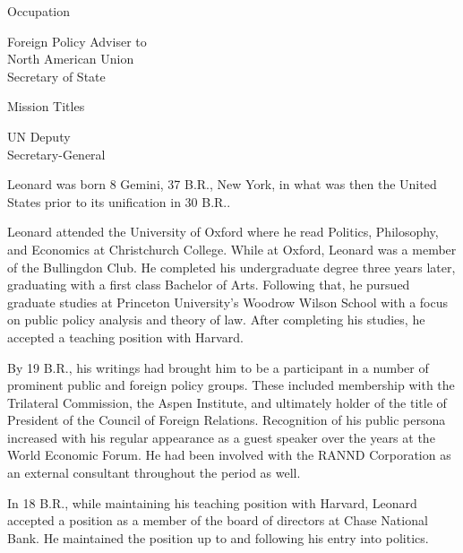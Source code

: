 {        \bTR
            \bTC Occupation \eTC
            \bTC 
                \startitemize[4]
                \startpacked
                \item Foreign Policy Adviser to\\North American Union\\Secretary of State
                \stoppacked
                \stopitemize
            \eTC
        \eTR
        
        \bTR
            \bTC Mission Titles \eTC
            \bTC 
                \startitemize[4]
                \startpacked
                \item UN Deputy\\Secretary-General
                \stoppacked
                \stopitemize
            \eTC            
        \eTR
    \eTABLEbody

\eTABLE
}

Leonard was born 8 Gemini, 37 B.R., New York, in what was then the United States prior to its unification in 30 B.R..

Leonard attended the University of Oxford where he read Politics, Philosophy, and Economics at Christchurch College. While at Oxford, Leonard was a member of the Bullingdon Club. He completed his undergraduate degree three years later, graduating with a first class Bachelor of Arts. Following that, he pursued graduate studies at Princeton University's Woodrow Wilson School with a focus on public policy analysis and theory of law. After completing his studies, he accepted a teaching position with Harvard.

By 19 B.R., his writings had brought him to be a participant in a number of prominent public and foreign policy groups. These included membership with the Trilateral Commission, the Aspen Institute, and ultimately holder of the title of President of the Council of Foreign Relations. Recognition of his public persona increased with his regular appearance as a guest speaker over the years at the World Economic Forum. He had been involved with the RANND Corporation as an external consultant throughout the period as well.

In 18 B.R., while maintaining his teaching position with Harvard, Leonard accepted a position as a member of the board of directors at Chase National Bank. He maintained the position up to and following his entry into politics.

